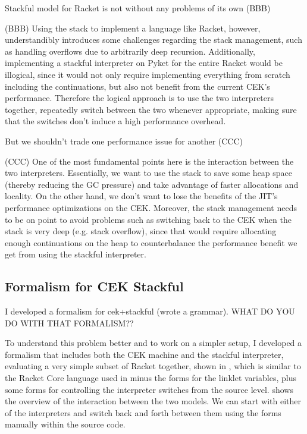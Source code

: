     \begin{paragraph-here}
      Stackful model for Racket is not without any problems of its own (BBB)
    \end{paragraph-here}

    (BBB) Using the stack to implement a language like Racket, however,
    understandibly introduces some challenges regarding the stack
    management, such as handling overflows due to arbitrarily deep
    recursion. Additionally, implementing a stackful interpreter on Pyket
    for the entire Racket would be illogical, since it would not only
    require implementing everything from scratch including the
    continuations, but also not benefit from the current CEK's
    performance. Therefore the logical approach is to use the two
    interpreters together, repeatedly switch between the two whenever
    appropriate, making sure that the switches don't induce a high
    performance overhead.

    \begin{paragraph-here}
      But we shouldn't trade one performance issue for another (CCC)
    \end{paragraph-here}

    (CCC) One of the most fundamental points here is the interaction between the
    two interpreters. Essentially, we want to use the stack to save some
    heap space (thereby reducing the GC pressure) and take advantage of
    faster allocations and locality. On the other hand, we don't want to
    lose the benefits of the JIT's performance optimizations on the
    CEK. Moreover, the stack management needs to be on point to avoid
    problems such as switching back to the CEK when the stack is very deep
    (e.g. stack overflow), since that would require allocating enough
    continuations on the heap to counterbalance the performance benefit we
    get from using the stackful interpreter.

    \subsection{Formalism for CEK \+ Stackful}

      \begin{paragraph-here}
        I developed a formalism for cek+stackful (wrote a grammar). WHAT DO YOU DO WITH THAT FORMALISM??
      \end{paragraph-here}

      To understand this problem better and to work on a simpler setup, I
      developed a formalism that includes both the CEK machine and the
      stackful interpreter, evaluating a very simple subset of Racket
      together, shown in , which is similar to the
      Racket Core language used in  minus
      the forms for the linklet variables, plus some 
      forms for controlling the interpreter switches from the source
      level.  shows the overview of the
      interaction between the two models. We can start with either of the
      interpreters and switch back and forth between them using the
       forms manually within the source code.

